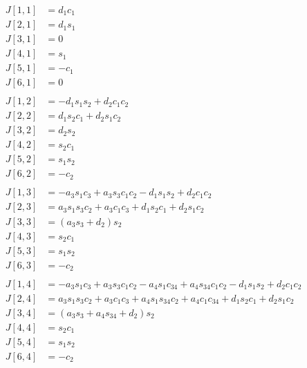 \documentclass{article}
\begin{document}
\begin{align*}
J[1,1] &= d_{1} c_{1} \\
J[2,1] &= d_{1} s_{1} \\
J[3,1] &= 0 \\
J[4,1] &= s_{1} \\
J[5,1] &= - c_{1} \\
J[6,1] &= 0 \\
\\
J[1,2] &= - d_{1} s_{1} s_{2} + d_{2} c_{1} c_{2} \\
J[2,2] &= d_{1} s_{2} c_{1} + d_{2} s_{1} c_{2} \\
J[3,2] &= d_{2} s_{2} \\
J[4,2] &= s_{2} c_{1} \\
J[5,2] &= s_{1} s_{2} \\
J[6,2] &= - c_{2} \\
\\
J[1,3] &= - a_{3} s_{1} c_{3} + a_{3} s_{3} c_{1} c_{2} - d_{1} s_{1} s_{2} + d_{2} c_{1} c_{2} \\
J[2,3] &= a_{3} s_{1} s_{3} c_{2} + a_{3} c_{1} c_{3} + d_{1} s_{2} c_{1} + d_{2} s_{1} c_{2} \\
J[3,3] &= \left(a_{3} s_{3} + d_{2}\right) s_{2} \\
J[4,3] &= s_{2} c_{1} \\
J[5,3] &= s_{1} s_{2} \\
J[6,3] &= - c_{2} \\
\\
J[1,4] &= - a_{3} s_{1} c_{3} + a_{3} s_{3} c_{1} c_{2} - a_{4} s_{1} c_{34} + a_{4} s_{34} c_{1} c_{2} - d_{1} s_{1} s_{2} + d_{2} c_{1} c_{2} \\
J[2,4] &= a_{3} s_{1} s_{3} c_{2} + a_{3} c_{1} c_{3} + a_{4} s_{1} s_{34} c_{2} + a_{4} c_{1} c_{34} + d_{1} s_{2} c_{1} + d_{2} s_{1} c_{2} \\
J[3,4] &= \left(a_{3} s_{3} + a_{4} s_{34} + d_{2}\right) s_{2} \\
J[4,4] &= s_{2} c_{1} \\
J[5,4] &= s_{1} s_{2} \\
J[6,4] &= - c_{2}
\end{align*}
\end{document}
